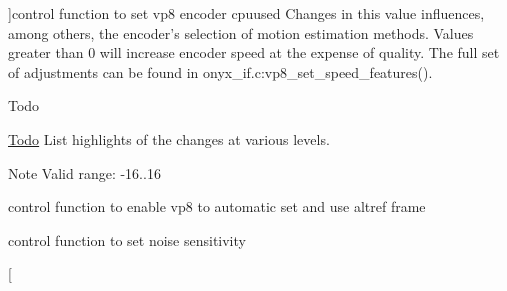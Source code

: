 \begin{Desc}
\begin{description}
{}]control function to set vp8 encoder cpuused \-Changes in this value influences, among others, the encoder's selection of motion estimation methods. \-Values greater than 0 will increase encoder speed at the expense of quality. \-The full set of adjustments can be found in onyx\-\_\-if.\-c\-:vp8\-\_\-set\-\_\-speed\-\_\-features(). \begin{DoxyRefDesc}{\-Todo}
\item[\hyperlink{todo__todo000001}{\-Todo}]\-List highlights of the changes at various levels.\end{DoxyRefDesc}


\begin{DoxyNote}{\-Note}
\-Valid range\-: -\/16..16 
\end{DoxyNote}
\item[{\em 
\hypertarget{group__vp8__encoder_gga6deae3d561c838952552c3d3756322eca24a5530efabb8b4949d01622b1d72cb0}{\-V\-P8\-E\-\_\-\-S\-E\-T\-\_\-\-E\-N\-A\-B\-L\-E\-A\-U\-T\-O\-A\-L\-T\-R\-E\-F}\label{group__vp8__encoder_gga6deae3d561c838952552c3d3756322eca24a5530efabb8b4949d01622b1d72cb0}
}]control function to enable vp8 to automatic set and use altref frame \item[{\em 
\hypertarget{group__vp8__encoder_gga6deae3d561c838952552c3d3756322eca3fa90cb70bade72af3c2d8d91471a36c}{\-V\-P8\-E\-\_\-\-S\-E\-T\-\_\-\-N\-O\-I\-S\-E\-\_\-\-S\-E\-N\-S\-I\-T\-I\-V\-I\-T\-Y}\label{group__vp8__encoder_gga6deae3d561c838952552c3d3756322eca3fa90cb70bade72af3c2d8d91471a36c}
}]control function to set noise sensitivity \item[{\em 
}
\end{description}
\end{Desc}
